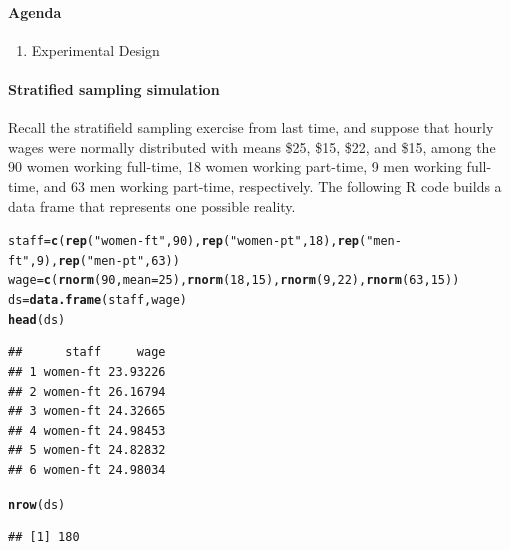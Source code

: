 \documentclass[10pt]{article}\usepackage[]{graphicx}\usepackage[]{color}
\makeatletter
\newcommand{\hlnum}[1]{\textcolor[rgb]{0.686,0.059,0.569}{#1}}%
\newcommand{\hlstr}[1]{\textcolor[rgb]{0.192,0.494,0.8}{#1}}%
\newcommand{\hlstd}[1]{\textcolor[rgb]{0.345,0.345,0.345}{#1}}%
\newcommand{\hlkwb}[1]{\textcolor[rgb]{0.69,0.353,0.396}{#1}}%
\newcommand{\hlkwc}[1]{\textcolor[rgb]{0.333,0.667,0.333}{#1}}%
\newcommand{\hlkwd}[1]{\textcolor[rgb]{0.737,0.353,0.396}{\textbf{#1}}}%
\newenvironment{kframe}{%
 \def\at@end@of@kframe{}%
 \ifinner\ifhmode%
  \def\at@end@of@kframe{\end{minipage}}%
  \begin{minipage}{\columnwidth}%
 \fi\fi%
 \def\FrameCommand##1{\hskip\@totalleftmargin \hskip-\fboxsep
 \colorbox{shadecolor}{##1}\hskip-\fboxsep
     \hskip-\linewidth \hskip-\@totalleftmargin \hskip\columnwidth}%
 \MakeFramed {\advance\hsize-\width
   \@totalleftmargin\z@ \linewidth\hsize
   \@setminipage}}%
 {\par\unskip\endMakeFramed%
 \at@end@of@kframe}
\newenvironment{knitrout}{}{} %
\newcommand{\R}{{\sf R}\xspace}
\makeatother
\begin{document}
\paragraph{Agenda}
\begin{enumerate}
  \itemsep0em
  \item Experimental Design
\end{enumerate}


\paragraph{Stratified sampling simulation}

  Recall the stratifield sampling exercise from last time, and suppose that hourly wages were normally distributed with means \$25, \$15, \$22, and \$15, among the 90 women working full-time, 18 women working part-time, 9 men working full-time, and 63 men working part-time, respectively. The following \R code builds a data frame that represents one possible reality. 

\begin{knitrout}
\color{fgcolor}\begin{kframe}
\begin{alltt}
\hlstd{staff} \hlkwb{=} \hlkwd{c}\hlstd{(}\hlkwd{rep}\hlstd{(}\hlstr{"women-ft"}\hlstd{,} \hlnum{90}\hlstd{),} \hlkwd{rep}\hlstd{(}\hlstr{"women-pt"}\hlstd{,} \hlnum{18}\hlstd{),} \hlkwd{rep}\hlstd{(}\hlstr{"men-ft"}\hlstd{,} \hlnum{9}\hlstd{),} \hlkwd{rep}\hlstd{(}\hlstr{"men-pt"}\hlstd{,} \hlnum{63}\hlstd{))}
\hlstd{wage} \hlkwb{=} \hlkwd{c}\hlstd{(}\hlkwd{rnorm}\hlstd{(}\hlnum{90}\hlstd{,} \hlkwc{mean} \hlstd{=} \hlnum{25}\hlstd{),} \hlkwd{rnorm}\hlstd{(}\hlnum{18}\hlstd{,} \hlnum{15}\hlstd{),} \hlkwd{rnorm}\hlstd{(}\hlnum{9}\hlstd{,} \hlnum{22}\hlstd{),} \hlkwd{rnorm}\hlstd{(}\hlnum{63}\hlstd{,} \hlnum{15}\hlstd{))}
\hlstd{ds} \hlkwb{=} \hlkwd{data.frame}\hlstd{(staff, wage)}
\hlkwd{head}\hlstd{(ds)}
\end{alltt}
\begin{verbatim}
##      staff     wage
## 1 women-ft 23.93226
## 2 women-ft 26.16794
## 3 women-ft 24.32665
## 4 women-ft 24.98453
## 5 women-ft 24.82832
## 6 women-ft 24.98034
\end{verbatim}
\begin{alltt}
\hlkwd{nrow}\hlstd{(ds)}
\end{alltt}
\begin{verbatim}
## [1] 180
\end{verbatim}
\end{kframe}
\end{knitrout}
\end{document}
